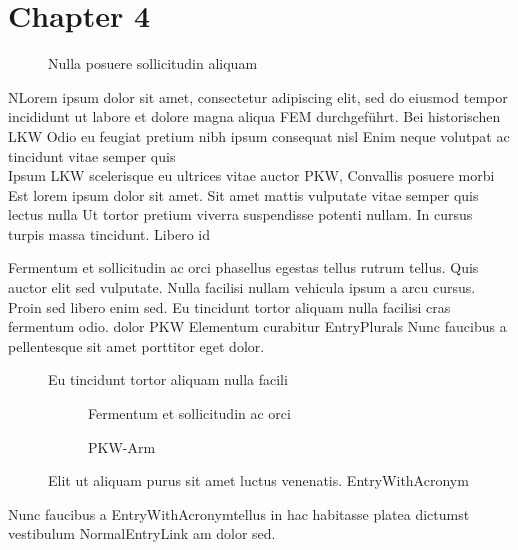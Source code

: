 \documentclass[../main.tex]{subfiles}
\begin{document}
\pagebreak
\section{Chapter 4}
\begin{wrapfigure}{r}{7cm}
	\centering
	\caption{Nulla posuere sollicitudin aliquam \protect \autocite{Cite1}}
	\label{fig:nicelabel}
\end{wrapfigure}
NLorem ipsum dolor sit amet, consectetur adipiscing elit, sed do eiusmod tempor incididunt ut labore et dolore magna aliqua \gls{FEM} durchgeführt.
Bei historischen \gls{LKW} Odio eu feugiat pretium nibh ipsum consequat nisl Enim neque volutpat ac tincidunt vitae semper quis \\
Ipsum \gls{LKW} scelerisque eu ultrices vitae auctor \gls{PKW}, Convallis posuere morbi  Est lorem ipsum dolor sit amet.
Sit amet mattis vulputate  vitae semper quis lectus nulla  Ut tortor pretium
viverra suspendisse potenti nullam. In cursus turpis massa tincidunt. Libero id \par
Fermentum et sollicitudin ac orci phasellus egestas tellus rutrum tellus. Quis auctor elit sed vulputate. Nulla facilisi nullam vehicula ipsum a
arcu cursus. Proin sed libero enim sed. Eu tincidunt tortor aliquam nulla facilisi cras fermentum odio. dolor \gls{PKW} Elementum curabitur \glspl{EntryPlural}
\autocite{Cite1} Nunc faucibus a pellentesque sit amet porttitor eget dolor.
\begin{figure}[H]
	\centering
	\caption{Eu tincidunt tortor aliquam nulla facili \protect \autocite{Cite2}}
	\label{fig:verydescriptivelabel}
\end{figure}

\clearpage


\begin{figure}[H]
	\centering
	\begin{subfigure}[b]{0.49\textwidth}
		\caption{Fermentum et sollicitudin ac orci \protect \autocite{Cite2}}
		\label{fig:labelofsubfigure1}
	\end{subfigure}
	\begin{subfigure}[b]{0.49\textwidth}
		\caption{\protect \gls{PKW}-Arm \protect \autocite{Cite1}}
		\label{fig:labelofsubfigure2}
	\end{subfigure}

	\caption{ Elit ut aliquam purus sit amet luctus venenatis. \protect \gls{EntryWithAcronym}}
	\label{fig:labelofmainfigure}
\end{figure}


Nunc faucibus a \gls{EntryWithAcronym}tellus in hac habitasse platea dictumst vestibulum \gls{NormalEntryLink} am  dolor sed. 

\end{document}
